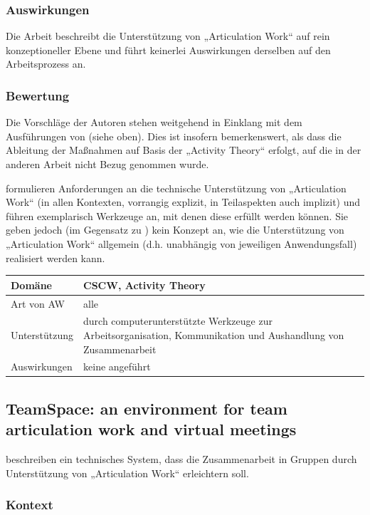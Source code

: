 \subsubsection{Auswirkungen}

Die Arbeit beschreibt die Unterstützung von „Articulation Work“ auf rein konzeptioneller Ebene und führt keinerlei Auswirkungen derselben auf den Arbeitsprozess an.

\subsubsection{Bewertung}

Die Vorschläge der Autoren stehen weitgehend in Einklang mit dem Ausführungen von \citep{Schmidt96} (siehe oben). Dies ist insofern bemerkenswert, als dass die Ableitung der Maßnahmen auf Basis der „Activity Theory“ erfolgt, auf die in der anderen Arbeit nicht Bezug genommen wurde.

\citeauthor{Fjuk97} formulieren Anforderungen an die technische Unterstützung von „Articulation Work“ (in allen Kontexten, vorrangig explizit, in Teilaspekten auch implizit) und führen exemplarisch Werkzeuge an, mit denen diese erfüllt werden können. Sie geben jedoch (im Gegensatz zu \citep{Schmidt96}) kein Konzept an, wie die Unterstützung von „Articulation Work“ allgemein (d.h. unabhängig von jeweiligen Anwendungsfall) realisiert werden kann.
\\[1em]
\begin{tabular}{| p{3cm} | p{10cm} |}
  \hline
  Domäne & \gls{CSCW}, Activity Theory \\ \hline
  Art von AW & alle \\ \hline
  Unterstützung & durch computerunterstützte Werkzeuge zur Arbeitsorganisation, Kommunikation und Aushandlung von Zusammenarbeit\\ \hline
  Auswirkungen & keine angeführt \\ \hline
\end{tabular}

\subsection{TeamSpace: an environment for team articulation work and virtual meetings}

\citep{Fuchs01} beschreiben ein technisches System, dass die Zusammenarbeit in Gruppen durch Unterstützung von „Articulation Work“ erleichtern soll.

\subsubsection{Kontext}

